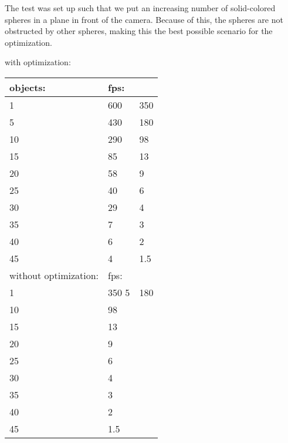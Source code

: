 			The test was set up such that we put an increasing number of solid-colored spheres in a 
			plane in front of the camera. Because of this, the spheres are not obstructed
			by other spheres, making this the best possible scenario for the optimization.

			with optimization:

			\begin{tabular}{|l|l|l|}
				\hline
				objects: & fps:	\\ \hline 
				1	& 600 & 350	\\ \hline 
				5	& 430 & 180	\\ \hline			
				10	& 290 & 98	\\ \hline
				15	& 85 & 13	\\ \hline
				20	& 58 & 9	\\ \hline
				25	& 40 & 6	\\ \hline
				30	& 29 & 4	\\ \hline
				35	& 7 & 3		\\ \hline
				40	& 6 & 2		\\ \hline
				45	& 4	& 1.5	\\ \hline


			without optimization:

			\begin{tabular}{|l|l|}
				\hline
				objects: & fps:	\\ \hline 
				1	& 350
				5	& 180	\\ \hline			
				10	& 98	\\ \hline
				15	& 13	\\ \hline
				20	& 9		\\ \hline
				25	& 6		\\ \hline
				30	& 4		\\ \hline
				35	& 3		\\ \hline
				40	& 2		\\ \hline
				45	& 1.5	\\ \hline

	
			\end{tabular}



		
		
		

